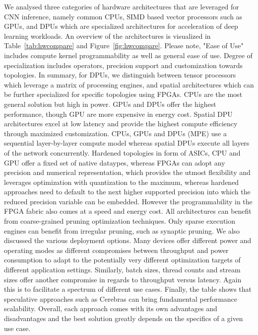 We analysed three categories of hardware architectures that are leveraged for CNN inference, namely common CPUs, SIMD based vector processors such as GPUs, and DPUs which are specialized architectures for acceleration of deep learning workloads. 
An overview of the architectures is visualized in Table~\ref{tab:hwcompare} and Figure~\ref{fig:hwcompare}.
Please note, "Ease of Use" includes compute kernel programmability as well as general ease of use.
Degree of specialization includes operators, precision support and customization towards topologies.
In summary, for DPUs, we distinguish between tensor processors which leverage a matrix of processing engines, and spatial architectures which can be further specialized for specific topologies using FPGAs.
CPUs are the most general solution but high in power. GPUs and DPUs offer the highest performance, though GPU are more expensive in energy cost. Spatial DPU architectures excel at low latency and provide the highest compute efficiency through maximized customization. 
CPUs, GPUs and DPUs (MPE) use a sequential layer-by-layer compute model whereas spatial DPUs execute all layers of the network concurrently. 
Hardened topologies in form of ASICs, CPU and GPU offer a fixed set of native dataypes, whereas FPGAs can adopt any precision and numerical representation, which provides the utmost flexibility and leverages optimization with quantization to the maximum, whereas hardened approaches need to default to the next higher supported precision into which the reduced precision variable can be embedded. However the programmability in the FPGA fabric also comes at a speed and energy cost.
All architectures can benefit from coarse-grained pruning optimization techniques. Only sparse execution engines can benefit from irregular pruning, such as synaptic pruning.
We also discussed the various deployment options. 
Many devices offer different power and operating modes as different compromises between throughput and power consumption to adapt to the potentially very different optimization targets of different application settings. Similarly, batch sizes, thread counts and stream sizes offer another compromise in regards to throughput versus latency. Again this is to facilitate a spectrum of different use cases.
Finally, the table shows that speculative approaches such as Cerebras can bring fundamental performance scalability.
Overall, each approach comes with its own advantages and disadvantages and the best solution greatly depends on the specifics of a given use case.

